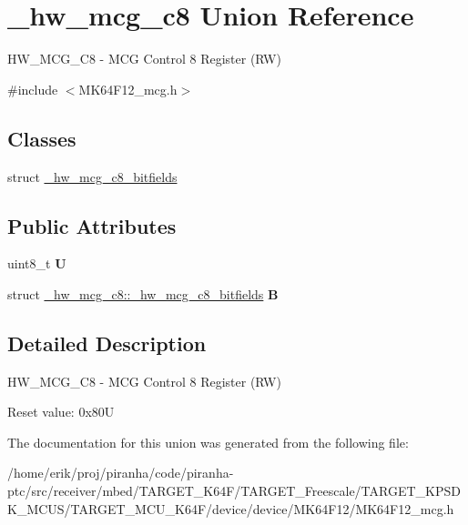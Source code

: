 \hypertarget{union__hw__mcg__c8}{}\section{\+\_\+hw\+\_\+mcg\+\_\+c8 Union Reference}
\label{union__hw__mcg__c8}


H\+W\+\_\+\+M\+C\+G\+\_\+\+C8 -\/ M\+CG Control 8 Register (RW)  




{\ttfamily \#include $<$M\+K64\+F12\+\_\+mcg.\+h$>$}

\subsection*{Classes}
\begin{DoxyCompactItemize}
\item 
struct \hyperlink{struct__hw__mcg__c8_1_1__hw__mcg__c8__bitfields}{\+\_\+hw\+\_\+mcg\+\_\+c8\+\_\+bitfields}
\end{DoxyCompactItemize}
\subsection*{Public Attributes}
\begin{DoxyCompactItemize}
\item 
uint8\+\_\+t {\bfseries U}\hypertarget{union__hw__mcg__c8_abf5a3ccbf515988b53ef4284213d0594}{}\label{union__hw__mcg__c8_abf5a3ccbf515988b53ef4284213d0594}

\item 
struct \hyperlink{struct__hw__mcg__c8_1_1__hw__mcg__c8__bitfields}{\+\_\+hw\+\_\+mcg\+\_\+c8\+::\+\_\+hw\+\_\+mcg\+\_\+c8\+\_\+bitfields} {\bfseries B}\hypertarget{union__hw__mcg__c8_a84ea4103c4a6f29e11887262fcd771c2}{}\label{union__hw__mcg__c8_a84ea4103c4a6f29e11887262fcd771c2}

\end{DoxyCompactItemize}


\subsection{Detailed Description}
H\+W\+\_\+\+M\+C\+G\+\_\+\+C8 -\/ M\+CG Control 8 Register (RW) 

Reset value\+: 0x80U 

The documentation for this union was generated from the following file\+:\begin{DoxyCompactItemize}
\item 
/home/erik/proj/piranha/code/piranha-\/ptc/src/receiver/mbed/\+T\+A\+R\+G\+E\+T\+\_\+\+K64\+F/\+T\+A\+R\+G\+E\+T\+\_\+\+Freescale/\+T\+A\+R\+G\+E\+T\+\_\+\+K\+P\+S\+D\+K\+\_\+\+M\+C\+U\+S/\+T\+A\+R\+G\+E\+T\+\_\+\+M\+C\+U\+\_\+\+K64\+F/device/device/\+M\+K64\+F12/M\+K64\+F12\+\_\+mcg.\+h\end{DoxyCompactItemize}
